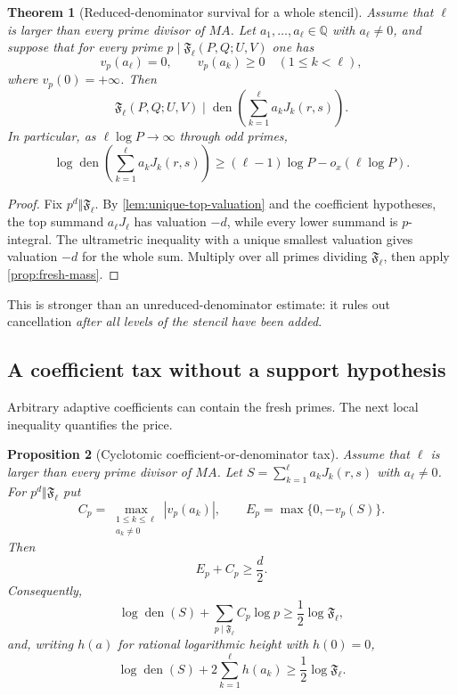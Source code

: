 \documentclass[11pt]{article}
\newtheorem{theorem}{Theorem}[section]
\newtheorem{proposition}[theorem]{Proposition}
\theoremstyle{definition}
\newcommand{\Q}{\mathbb Q}
\newcommand{\den}{\operatorname{den}}
\begin{document}
\begin{theorem}[Reduced-denominator survival for a whole stencil]
\label{thm:stencil-survival}
Assume that $\ell$ is larger than every prime divisor of $MA$.  Let
$a_1,\ldots,a_\ell\in\Q$ with $a_\ell\ne0$, and suppose that for every
prime $p\mid\mathfrak F_\ell(P,Q;U,V)$ one has
\[
 v_p(a_\ell)=0,
 \qquad
 v_p(a_k)\ge0\quad(1\le k<\ell),
\]
where $v_p(0)=+\infty$.  Then
\begin{equation}
 \mathfrak F_\ell(P,Q;U,V)
 \mid
 \den\left(\sum_{k=1}^{\ell}a_kJ_k(r,s)\right).
 \label{eq:stencil-survival}
\end{equation}
In particular, as $\ell\log P\to\infty$ through odd primes,
\begin{equation}
 \log\den\left(\sum_{k=1}^{\ell}a_kJ_k(r,s)\right)
 \ge(\ell-1)\log P-o_x(\ell\log P).
 \label{eq:stencil-den-lower}
\end{equation}
\end{theorem}

\begin{proof}
Fix $p^d\Vert\mathfrak F_\ell$.  By
\cref{lem:unique-top-valuation} and the coefficient hypotheses, the top
summand $a_\ell J_\ell$ has valuation $-d$, while every lower summand is
$p$-integral.  The
ultrametric inequality with a unique smallest valuation gives valuation
$-d$ for the whole sum.  Multiply over all primes dividing
$\mathfrak F_\ell$, then apply \cref{prop:fresh-mass}.
\end{proof}

This is stronger than an unreduced-denominator estimate: it rules out
cancellation \emph{after all levels of the stencil have been added}.

\subsection{A coefficient tax without a support hypothesis}

Arbitrary adaptive coefficients can contain the fresh primes.  The next
local inequality quantifies the price.

\begin{proposition}[Cyclotomic coefficient-or-denominator tax]
\label{prop:coefficient-tax}
Assume that $\ell$ is larger than every prime divisor of $MA$.  Let
$S=\sum_{k=1}^{\ell}a_kJ_k(r,s)$ with $a_\ell\ne0$.  For
$p^d\Vert\mathfrak F_\ell$ put
\[
 C_p=\max_{\substack{1\le k\le\ell\\ a_k\ne0}}|v_p(a_k)|,
 \qquad
 E_p=\max\{0,-v_p(S)\}.
\]
Then
\begin{equation}
 E_p+C_p\ge\frac d2.
 \label{eq:local-tax}
\end{equation}
Consequently,
\begin{equation}
 \log\den(S)+
 \sum_{p\mid\mathfrak F_\ell}C_p\log p
 \ge\frac12\log\mathfrak F_\ell,
 \label{eq:global-local-tax}
\end{equation}
and, writing $h(a)$ for rational logarithmic height with $h(0)=0$,
\begin{equation}
 \boxed{
 \log\den(S)+2\sum_{k=1}^{\ell}h(a_k)
 \ge\frac12\log\mathfrak F_\ell.
 }
 \label{eq:height-tax}
\end{equation}
\end{proposition}
\end{document}
